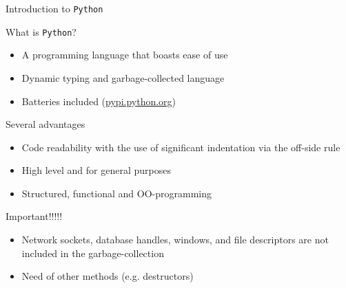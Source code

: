 \documentclass[10pt]{beamer}
\begin{document}
\begin{frame}{Introduction to \texttt{Python}}

\begin{block}{What is \texttt{Python}?}
\begin{itemize}
	\item A programming language that boasts ease of use
	\item Dynamic typing and garbage-collected language
	\item Batteries included (\small \url{pypi.python.org})
\end{itemize}
\end{block}

\begin{block}{Several advantages}
\begin{itemize}
	\item Code readability with the use of significant indentation via the off-side rule
	\item High level and for general purposes
	\item Structured, functional and OO-programming 
\end{itemize}
\end{block}

\begin{block}{Important!!!!!}
\begin{itemize}
	\item  Network sockets, database handles, windows, and file descriptors are not included in the garbage-collection
	\item Need of other methods (e.g. destructors)
\end{itemize}
\end{block}
\end{frame}
\end{document}
